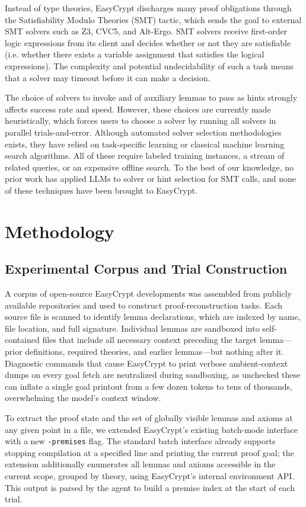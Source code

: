 \documentclass[acmsmall,natbib=false]{acmart}
\begin{document}
Instead of type theories, EasyCrypt discharges many proof obligations through the Satisfiability Modulo Theories (SMT) tactic, which sends the goal to external SMT solvers such as Z3, CVC5, and Alt-Ergo. SMT solvers receive first-order logic expressions from its client and decides whether or not they are satisfiable (i.e. whether there exists a variable assignment that satisfies the logical expressions). The complexity and potential undecidability of such a task means that a solver may timeout before it can make a decision.

The choice of solvers to invoke and of auxiliary lemmas to pass as hints strongly affects success rate and speed. However, these choices are currently made heuristically, which forces users to choose a solver by running all solvers in parallel trials-and-error. Although automated solver selection methodologies \cite{DBLP:conf/tacas/ScottNPNG21, fastSMT, ijcai2024p211} exists, they have relied on task-specific learning or classical machine learning search algorithms. All of these require labeled training instances, a stream of related queries, or an expensive offline search. To the best of our knowledge, no prior work has applied LLMs to solver or hint selection for SMT calls, and none of these techniques have been brought to EasyCrypt.


\section{Methodology}
\subsection{Experimental Corpus and Trial Construction}

A corpus of open-source EasyCrypt developments was assembled from publicly available repositories and used to construct proof-reconstruction tasks. Each source file is scanned to identify lemma declarations, which are indexed by name, file location, and full signature. Individual lemmas are sandboxed into self-contained files that include all necessary context preceding the target lemma---prior definitions, required theories, and earlier lemmas---but nothing after it. Diagnostic commands that cause EasyCrypt to print verbose ambient-context dumps on every goal fetch are neutralized during sandboxing, as unchecked these can inflate a single goal printout from a few dozen tokens to tens of thousands, overwhelming the model's context window.

To extract the proof state and the set of globally visible lemmas and axioms at any given point in a file, we extended EasyCrypt's existing batch-mode interface with a new \texttt{-premises} flag. The standard batch interface already supports stopping compilation at a specified line and printing the current proof goal; the extension additionally enumerates all lemmas and axioms accessible in the current scope, grouped by theory, using EasyCrypt's internal environment API. This output is parsed by the agent to build a premise index at the start of each trial.
\end{document}
